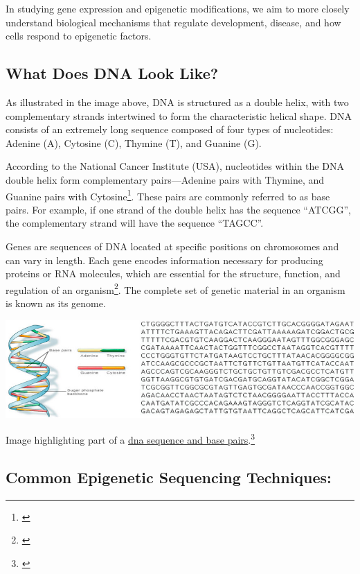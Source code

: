 \documentclass[
]{book}
\begin{document}
In studying gene expression and epigenetic modifications, we aim to more closely understand biological mechanisms that regulate development, disease, and how cells respond to epigenetic factors.

\subsection{What Does DNA Look Like?}\label{what-does-dna-look-like}

As illustrated in the image above, DNA is structured as a double helix, with two complementary strands intertwined to form the characteristic helical shape. DNA consists of an extremely long sequence composed of four types of nucleotides: Adenine (A), Cytosine (C), Thymine (T), and Guanine (G).

According to the National Cancer Institute (USA), nucleotides within the DNA double helix form complementary pairs---Adenine pairs with Thymine, and Guanine pairs with Cytosine\footnote{\citet{ncidefinitions}}. These pairs are commonly referred to as base pairs. For example, if one strand of the double helix has the sequence ``ATCGG'', the complementary strand will have the sequence ``TAGCC''.

Genes are sequences of DNA located at specific positions on chromosomes and can vary in length. Each gene encodes information necessary for producing proteins or RNA molecules, which are essential for the structure, function, and regulation of an organism\footnote{\citet{ncidefinitions}}. The complete set of genetic material in an organism is known as its genome.

\includegraphics{images/dna_sequence.png}

Image highlighting part of a \href{https://www.researchgate.net/profile/Pratik-Kanani/publication/341901570/figure/fig1/AS:898621708984321@1591259519483/A-human-DNA-and-Part-of-DNA-sequence-28-29.jpg}{dna sequence and base pairs}.\footnote{\citet{kanani2020}}

\subsection{Common Epigenetic Sequencing Techniques:}\label{common-epigenetic-sequencing-techniques}
\end{document}
